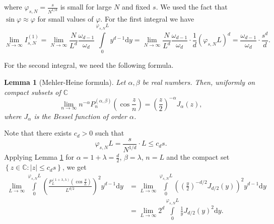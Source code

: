 \documentclass[a4paper,11pt]{amsart}
\newtheorem{lemma}{Lemma}
\begin{document}
where $\varphi_{s,N}=\frac{s}{N^{1/d}}$ is small for large $N$ and fixed $s$. We used the fact that $\sin\varphi \approx \varphi$ for small values of $\varphi$. For the first integral we have
$$ \lim\limits_{N\rightarrow\infty}I^{(1)}_{s,N}=\lim\limits_{N\rightarrow\infty}\frac{N}{L^d }\frac{\omega_{d-1}}{\omega_d}\int\limits_0^{\varphi_{s,N} L}y^{d-1}\mathrm{d}y= \lim\limits_{N\rightarrow\infty}\frac{N}{L^d }\frac{\omega_{d-1}}{\omega_d}\cdot \frac{1}{d}\left(\varphi_{s,N}L\right)^d= \frac{\omega_{d-1}}{\omega_d}\cdot\frac{s^d}{d}.$$

For the second integral, we need the following formula.
\begin{lemma}[Mehler-Heine formula]\label{Mehler-Heine formula}
    Let $\alpha,\beta$ be real numbers. Then, uniformly on compact subsets of $\mathbb{C}$
    $$\lim\limits_{n\rightarrow\infty}n^{-\alpha}P^{(\alpha,\beta)}_n\left(\cos\frac{z}{n}\right)=\left(\frac{z}{2}\right)^{-\alpha}J_\alpha(z),$$
    where $J_\alpha$ is the Bessel function of order $\alpha$.
\end{lemma}

Note that there exists $c_d>0$ such that 
$$\varphi_{s,N}L=\frac{s}{N^{1/d}}\cdot L\leq c_d s.$$
Applying Lemma \ref{Mehler-Heine formula} for $\alpha=1+\lambda=\frac{d}{2}$, $\beta=\lambda$, $n=L$ and the compact set $\left\{z\in\mathbb{C}:|z|\leq c_d s\right\}$, we get
\begin{align*}
   \lim\limits_{L\rightarrow\infty}\int\limits_0^{\varphi_{s,N} L}\left(\frac{P_L^{(1+\lambda,\lambda)}\left(\cos \frac{y}{L} \right)}{L^{d/2}}\right)^2 y^{d-1}\mathrm{d}y
    &= \lim\limits_{L\rightarrow\infty} \int\limits_0^{\varphi_{s,N} L}\left(\left(\frac{y}{2}\right)^{-d/2}J_{d/2}(y)\right)^2 y^{d-1}\mathrm{d}y 
    \\ &= \lim\limits_{L\rightarrow\infty}2^d\int\limits_0^{\varphi_{s,N} L}\frac{1}{y}J_{d/2}(y)^2\mathrm{d}y.
\end{align*}
\end{document}
